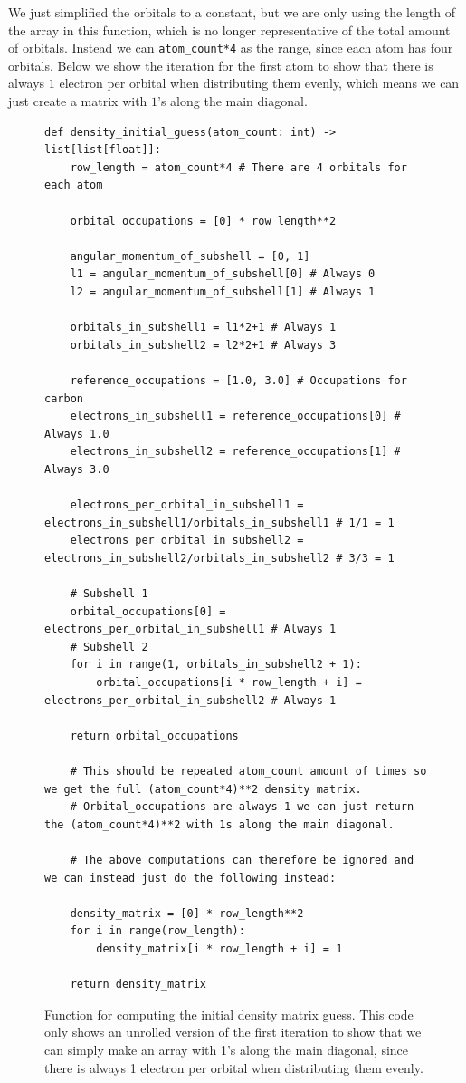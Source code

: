 We just simplified the orbitals to a constant, but we are only using the length of the array in this function, which is no longer representative of the total amount of orbitals. Instead we can \verb|atom_count*4| as the range, since each atom has four orbitals. Below we show the iteration for the first atom to show that there is always $1$ electron per orbital when distributing them evenly, which means we can just create a matrix with $1$'s along the main diagonal.

\begin{figure}[H]
\begin{verbatim}
def density_initial_guess(atom_count: int) -> list[list[float]]:
    row_length = atom_count*4 # There are 4 orbitals for each atom

    orbital_occupations = [0] * row_length**2

    angular_momentum_of_subshell = [0, 1]
    l1 = angular_momentum_of_subshell[0] # Always 0
    l2 = angular_momentum_of_subshell[1] # Always 1

    orbitals_in_subshell1 = l1*2+1 # Always 1
    orbitals_in_subshell2 = l2*2+1 # Always 3

    reference_occupations = [1.0, 3.0] # Occupations for carbon
    electrons_in_subshell1 = reference_occupations[0] # Always 1.0
    electrons_in_subshell2 = reference_occupations[1] # Always 3.0

    electrons_per_orbital_in_subshell1 = electrons_in_subshell1/orbitals_in_subshell1 # 1/1 = 1
    electrons_per_orbital_in_subshell2 = electrons_in_subshell2/orbitals_in_subshell2 # 3/3 = 1

    # Subshell 1
    orbital_occupations[0] = electrons_per_orbital_in_subshell1 # Always 1
    # Subshell 2
    for i in range(1, orbitals_in_subshell2 + 1):
        orbital_occupations[i * row_length + i] = electrons_per_orbital_in_subshell2 # Always 1

    return orbital_occupations

    # This should be repeated atom_count amount of times so we get the full (atom_count*4)**2 density matrix.
    # Orbital_occupations are always 1 we can just return the (atom_count*4)**2 with 1s along the main diagonal.

    # The above computations can therefore be ignored and we can instead just do the following instead:
    
    density_matrix = [0] * row_length**2
    for i in range(row_length):
        density_matrix[i * row_length + i] = 1

    return density_matrix
\end{verbatim}
\caption{Function for computing the initial density matrix guess. This code only shows an unrolled version of the first iteration to show that we can simply make an array with 1's along the main diagonal, since there is always 1 electron per orbital when distributing them evenly.}
\end{figure}


